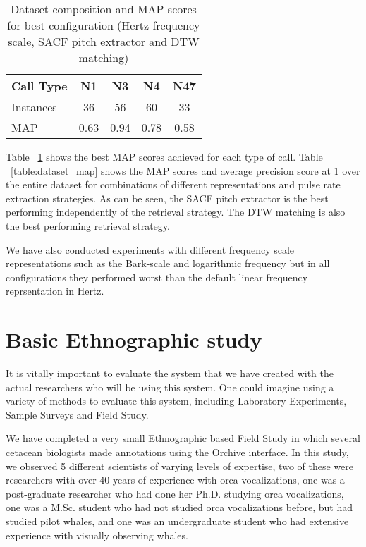 \begin{table} 
\begin{center}
\begin{tabular}{|l|c|c|c|c|}
\hline
Call Type     & N1      & N3      & N4 & N47 \\ 
\hline 
Instances     & 36      & 56      & 60  &  33 \\ 
\hline 
MAP            & 0.63   &  0.94   & 0.78  & 0.58  \\ 
\hline 
\end{tabular} 
\caption{Dataset composition and MAP scores for best configuration
  (Hertz frequency scale, SACF pitch extractor and DTW matching) } 
\label{table:dataset}
\end{center}
\end{table} 


Table ~\ref{table:dataset} shows the best MAP scores achieved for each
type of call. Table ~\ref{table:dataset_map} shows the MAP scores and
average precision score at 1 over the entire dataset for combinations
of different representations and pulse rate extraction strategies. As
can be seen, the SACF pitch extractor is the best performing
independently of the retrieval strategy. The DTW matching is also the
best performing retrieval strategy.

We have also conducted experiments with different frequency scale 
representations such as the Bark-scale \cite{} and logarithmic frequency 
but in all configurations they performed worst than the default linear
frequency reprsentation in Hertz. 



\section{Basic Ethnographic study}

It is vitally important to evaluate the system that we have created
with the actual researchers who will be using this system.  One could
imagine using a variety of methods to evaluate this system, including
Laboratory Experiments, Sample Surveys and Field Study.  

We have completed a very small Ethnographic based Field Study in which
several cetacean biologists made annotations using the Orchive
interface.  In this study, we observed 5 different scientists of
varying levels of expertise, two of these were researchers with over
40 years of experience with orca vocalizations, one was a
post-graduate researcher who had done her Ph.D. studying orca
vocalizations, one was a M.Sc. student who had not studied orca
vocalizations before, but had studied pilot whales, and one was an
undergraduate student who had extensive experience with visually
observing whales.

